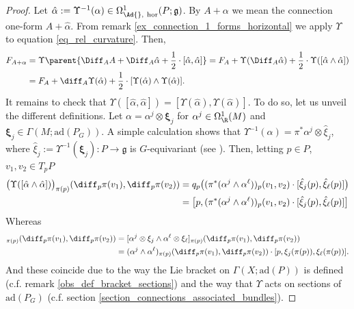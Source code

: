 {
\begin{proof}
    Let \(\hat{\alpha}:=\Upsilon^{-1}(\alpha)\in \Omega_{\Ad{}, \ \text{hor}}^1(P; \mathfrak{g})\). By \(A+\alpha\) we mean the connection one-form \(A+\hat{\alpha}\). From remark \ref{ex_connection_1_forms_horizontal} we apply \(\Upsilon\) to equation \eqref{eq_rel_curvature}. Then,
    \begin{align*}
        F_{A+\alpha} & = \Upsilon\parent{\Diff_AA + \Diff_A \hat{\alpha} + \frac{1}{2}\cdot [\hat{\alpha}, \hat{\alpha}]} = F_A+ \Upsilon(\Diff_A \hat{\alpha})+ \frac{1}{2}\cdot \Upsilon([\hat{\alpha} \wedge  \hat{\alpha}]) \\
        &= F_A + \diff_A \Upsilon(\hat{\alpha}) + \frac{1}{2}\cdot [\Upsilon(\hat{\alpha}) \wedge \Upsilon(\hat{\alpha})].
    \end{align*}
    It remains to check that \(\Upsilon([\hat{\alpha}, \hat{\alpha}])=[\Upsilon(\hat{\alpha}), \Upsilon(\hat{\alpha})]\). To do so, let us unveil the different definitions. Let \(\alpha=\alpha^j \otimes \bm{\xi}_j\) for \(\alpha^j \in \Omega_\R^1(M)\) and \(\bm{\xi}_j \in \Gamma(M; \mathrm{ad}(P_G))\). A simple calculation shows that \(\Upsilon^{-1}(\alpha)=\pi^* \alpha^j \otimes \hat{\xi}_j\), where \(\hat{\xi}_j:=\Upsilon^{-1}(\bm{\xi}_j)\colon P \to \mathfrak{g}\) is \(G\)-equivariant (see \parencite[Remark 1.2.13]{Rudolph_2017pug}). Then, letting \(p \in P\), \(v_1, v_2 \in T_pP\)
    \begin{align*}
        \big(\Upsilon([\hat{\alpha}\wedge \hat{\alpha}])\big)_{\pi(p)}(\diff_p\pi(v_1), \diff_p\pi(v_2)) & = q_p \big((\pi^*(\alpha^j \wedge \alpha ^\ell))_{p}(v_1, v_2) \cdot [\hat{\xi}_j(p), \hat{\xi}_\ell(p)]\big) \\
        &=\big[p,(\pi^*(\alpha^j \wedge \alpha ^\ell))_{p}(v_1, v_2) \cdot [\hat{\xi}_j(p), \hat{\xi}_\ell(p)]  \big]
    \end{align*}
    Whereas
    \begin{align*}
        [\Upsilon(\hat{\alpha}) \wedge \Upsilon(\hat{\alpha})]_{\pi(p)}(\diff_p\pi(v_1), \diff_p\pi(v_2)) &= [\alpha^j \otimes \xi_j \wedge \alpha^\ell \otimes \xi_\ell]_{\pi(p)}(\diff_p\pi(v_1), \diff_p\pi(v_2)) \\
        & = (\alpha^j \wedge \alpha^\ell)_{\pi(p)}(\diff_p\pi(v_1), \diff_p\pi(v_2))\cdot [p, \xi_j(\pi(p)), \xi_{\ell}(\pi(p))].
    \end{align*}
    And these coincide due to the way the Lie bracket on \(\Gamma(X; \mathrm{ad}(P))\) is defined (c.f. remark \ref{obs_def_bracket_sections}) and the way that \(\Upsilon\) acts on sections of \(\mathrm{ad}(P_G)\) (c.f. section \ref{section_connections_associated_bundles}).
\end{proof}

}
